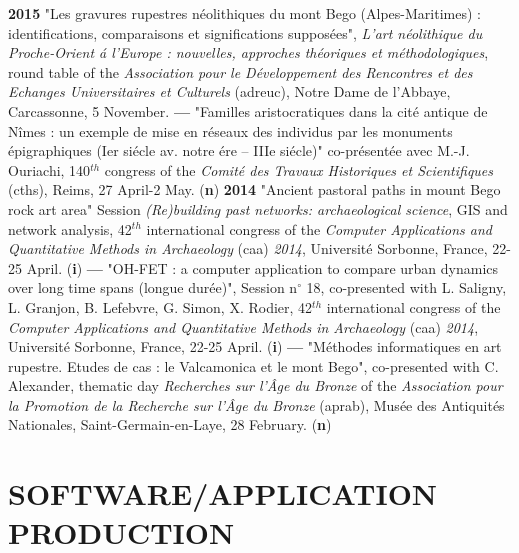 \documentclass[11pt]{report} %
\begin{document}
\smallbreak
\textbf{2015 }"Les gravures rupestres n\'{e}olithiques du mont Bego (Alpes-Maritimes) : identifications, comparaisons et significations suppos\'{e}es", \textit{L'art n\'{e}olithique du Proche-Orient \'{a} l'Europe : nouvelles, approches th\'{e}oriques et m\'{e}thodologiques}, round table of the \textit{Association pour le D\'{e}veloppement des Rencontres et des Echanges Universitaires et Culturels} (adreuc), Notre Dame de l'Abbaye, Carcassonne, 5 November.
\smallbreak
\textbf{---  }"Familles aristocratiques dans la cit\'{e} antique de N\^{i}mes : un exemple de mise en r\'{e}seaux des individus par les monuments \'{e}pigraphiques (Ier si\'{e}cle av. notre \'{e}re -- IIIe si\'{e}cle)" co-pr\'{e}sent\'{e}e avec M.-J. Ouriachi, 140${}^{th}$ congress of the \textit{Comit\'{e} des Travaux Historiques et Scientifiques} (cths), Reims, 27 April-2 May. (\textbf{n})
\smallbreak
\textbf{2014 }"Ancient pastoral paths in mount Bego rock art area" Session \textit{(Re)building past networks: archaeological science}, GIS and network analysis, 42${}^{th}$ international congress of the \textit{Computer Applications and Quantitative Methods in Archaeology }(caa) \textit{2014}, Universit\'{e} Sorbonne, France, 22-25 April. (\textbf{i})\textbf{}
\smallbreak
\textbf{---  }"OH-FET : a computer application to compare urban dynamics over long time spans (longue dur\'{e}e)", Session n$\mathrm{{}^\circ}$ 18, co-presented with L. Saligny, L. Granjon, B. Lefebvre, G. Simon, X. Rodier, 42${}^{th}$ international congress of the \textit{Computer Applications and Quantitative Methods in Archaeology }(caa)\textit{ 2014}, Universit\'{e} Sorbonne, France, 22-25 April. (\textbf{i})
\smallbreak
\textbf{---  }"M\'{e}thodes informatiques en art rupestre. Etudes de cas : le Valcamonica et le mont Bego", co-presented with C. Alexander, thematic day \textit{Recherches sur l'\^{A}ge du Bronze }of the\textit{ Association pour la Promotion de la Recherche sur l'\^{A}ge du Bronze }(aprab), Mus\'{e}e des Antiquit\'{e}s Nationales, Saint-Germain-en-Laye, 28 February. (\textbf{n})

\section*{SOFTWARE/APPLICATION PRODUCTION}
\end{document}
